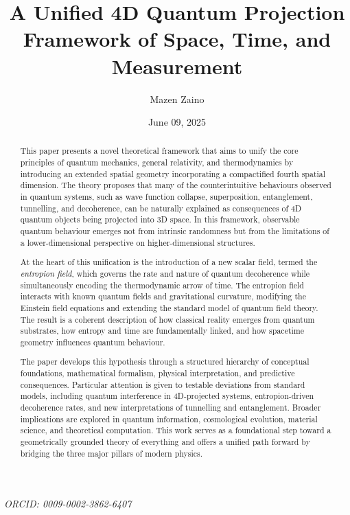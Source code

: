 \documentclass[12pt]{article}
\title{A Unified 4D Quantum Projection Framework of Space, Time, and Measurement}
\author{Mazen Zaino}
\date{June 09, 2025}
\begin{document}
\maketitle
\begin{center}
\textit{ORCID: 0009-0002-3862-6407\\
}
\end{center}

\begin{abstract}
This paper presents a novel theoretical framework that aims to unify the core principles of quantum mechanics, general relativity, and thermodynamics by introducing an extended spatial geometry incorporating a compactified fourth spatial dimension. The theory proposes that many of the counterintuitive behaviours observed in quantum systems, such as wave function collapse, superposition, entanglement, tunnelling, and decoherence, can be naturally explained as consequences of 4D quantum objects being projected into 3D space. In this framework, observable quantum behaviour emerges not from intrinsic randomness but from the limitations of a lower-dimensional perspective on higher-dimensional structures.

At the heart of this unification is the introduction of a new scalar field, termed the \textit{entropion field}, which governs the rate and nature of quantum decoherence while simultaneously encoding the thermodynamic arrow of time. The entropion field interacts with known quantum fields and gravitational curvature, modifying the Einstein field equations and extending the standard model of quantum field theory. The result is a coherent description of how classical reality emerges from quantum substrates, how entropy and time are fundamentally linked, and how spacetime geometry influences quantum behaviour.

The paper develops this hypothesis through a structured hierarchy of conceptual foundations, mathematical formalism, physical interpretation, and predictive consequences. Particular attention is given to testable deviations from standard models, including quantum interference in 4D-projected systems, entropion-driven decoherence rates, and new interpretations of tunnelling and entanglement. Broader implications are explored in quantum information, cosmological evolution, material science, and theoretical computation. This work serves as a foundational step toward a geometrically grounded theory of everything and offers a unified path forward by bridging the three major pillars of modern physics.
\end{abstract}
\end{document}
